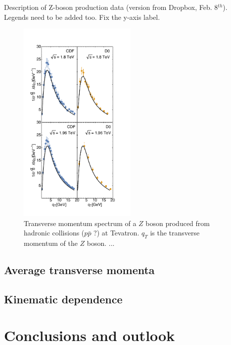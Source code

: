 \documentclass[aps,preprintnumbers,showpacs,nofootinbib,superscriptaddress,floatfix]{revtex4}
\begin{document}
Description of Z-boson production data (version from Dropbox, Feb. 8$^{th}$).
Legends need to be added too. Fix the y-axis label.
\begin{figure}[h!]
\begin{center}
\includegraphics[height=10cm]{plots/DY-Z/Z_SCIplot_flINDEP.pdf}
\end{center}
\caption{Transverse momentum spectrum of a $Z$ boson produced from hadronic collisions ($p\bar{p}$ ?) at Tevatron. $q_T$ is the transverse momentum of the $Z$ boson. ... } 
\label{f:Z_qT}
\end{figure}





\subsection{Average transverse momenta}
\label{ss:kT2_PT2}


\subsection{Kinematic dependence}
\label{ss:kindep}








\section{Conclusions and outlook}
\label{s:end}
\end{document}
